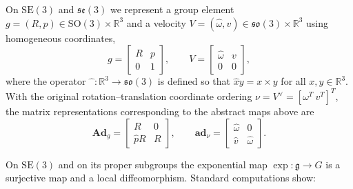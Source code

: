 \documentclass[10pt,twocolumn]{article}
\newenvironment{revision}{\color{red}}{}
\newcommand{\bAd}{\mathbf{Ad}}
\newcommand{\bad}{\mathbf{ad}}
\newcommand{\SO}{\mathrm{SO}}
\newcommand{\SE}{\mathrm{SE}}
\newcommand{\so}{\mathfrak{so}}
\newcommand{\se}{\mathfrak{se}}
\newcommand{\gfrak}{\mathfrak g}
\newcommand{\R}{\mathbb R}
\begin{document}
On $\SE(3)$ and $\se(3)$ we represent a group element $g=(R,p)\in\SO(3)\times\R^3$ and a velocity $V=(\widehat\omega,v)\in\so(3)\times\R^3$ using homogeneous coordinates,
\begin{equation*}
g=\begin{bmatrix}R&p\\0&1\end{bmatrix},
\qquad
V=\begin{bmatrix}\widehat\omega&v\\0&0\end{bmatrix},
\end{equation*}
where the operator $\widehat{\phantom{x}}:\R^3\to\so(3)$ is defined so that $\widehat{x}y=x\times y$ for all $x,y\in\R^3$.
\begin{revision}
With the original rotation--translation coordinate ordering $\nu=V^\vee=[\omega^T\ v^T]^T$, the matrix representations corresponding to the abstract maps above are
\[
\bAd_g=\begin{bmatrix}R&0\\\widehat pR&R\end{bmatrix},\qquad
\bad_\nu=\begin{bmatrix}\widehat\omega&0\\\widehat v&\widehat\omega\end{bmatrix}.
\]
\end{revision}


On $\SE(3)$ and on its proper subgroups the exponential map $\exp:\gfrak\to G$ is a surjective map and a local diffeomorphism. Standard computations show:
\end{document}

